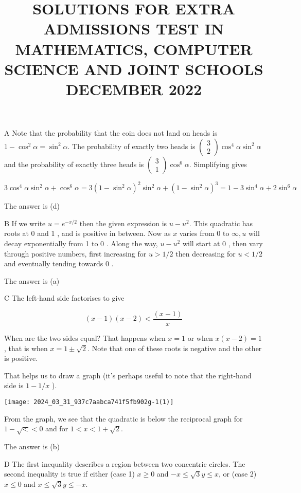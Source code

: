 \documentclass[10pt]{article}
\title{SOLUTIONS FOR EXTRA ADMISSIONS TEST IN MATHEMATICS, COMPUTER SCIENCE AND JOINT SCHOOLS DECEMBER 2022 }
\author{}
\date{}
\begin{document}
\maketitle
A Note that the probability that the coin does not land on heads is $1-\cos ^{2} \alpha=\sin ^{2} \alpha$. The probability of exactly two heads is $\left(\begin{array}{l}3 \\ 2\end{array}\right) \cos ^{4} \alpha \sin ^{2} \alpha$ and the probability of exactly three heads is $\left(\begin{array}{l}3 \\ 1\end{array}\right) \cos ^{6} \alpha$. Simplifying gives

$$
3 \cos ^{4} \alpha \sin ^{2} \alpha+\cos ^{6} \alpha=3\left(1-\sin ^{2} \alpha\right)^{2} \sin ^{2} \alpha+\left(1-\sin ^{2} \alpha\right)^{3}=1-3 \sin ^{4} \alpha+2 \sin ^{6} \alpha
$$

The answer is (d)

B If we write $u=e^{-x / 2}$ then the given expression is $u-u^{2}$. This quadratic has roots at 0 and 1 , and is positive in between. Now as $x$ varies from 0 to $\infty, u$ will decay exponentially from 1 to 0 . Along the way, $u-u^{2}$ will start at 0 , then vary through positive numbers, first increasing for $u>1 / 2$ then decreasing for $u<1 / 2$ and eventually tending towards 0 .

The answer is (a)

C The left-hand side factorises to give

$$
(x-1)(x-2)<\frac{(x-1)}{x}
$$

When are the two sides equal? That happens when $x=1$ or when $x(x-2)=1$, that is when $x=1 \pm \sqrt{2}$. Note that one of these roots is negative and the other is positive.

That helps us to draw a graph (it's perhaps useful to note that the right-hand side is $1-1 / x$ ).

\begin{center}
\texttt{[image: 2024\_03\_31\_937c7aabca741f5fb902g-1(1)]}
\end{center}

From the graph, we see that the quadratic is below the reciprocal graph for $1-\sqrt{<}<0$ and for $1<x<1+\sqrt{2}$.

The answer is (b)

D The first inequality describes a region between two concentric circles. The second inequality is true if either (case 1) $x \geq 0$ and $-x \leq \sqrt{3} y \leq x$, or (case 2) $x \leq 0$ and $x \leq \sqrt{3} y \leq-x$.
\end{document}
